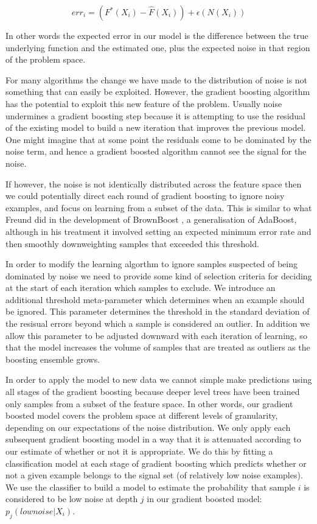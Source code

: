 \documentclass[12pt,a4paper]{article}
\begin{document}
\begin{equation}
err_i = ( F^*(X_i) - \hat{F}(X_i) )  + \epsilon(N(X_i))
\label{eq:noisyerror}
\end{equation}

In other words the expected error in our model is the difference between the true underlying function and the estimated one,
plus the expected noise in that region of the problem space.

For many algorithms the change we have made to the distribution of noise is not something that can easily be exploited.
However, the gradient boosting algorithm has the potential to exploit this new feature of the problem. Usually noise undermines
a gradient boosting step because it is attempting to use the residual of the existing model to build a new iteration that
improves the previous model. One might imagine that at some point the residuals come to be dominated by the noise term, and hence a
gradient boosted algorithm cannot see the signal for the noise.

If however, the noise is not identically distributed across the feature space then we could potentially direct each round of
gradient boosting to ignore noisy examples, and focus on learning from a subset of the data. This is similar to what Freund
did in the development of BrownBoost \cite{Freund2001}, a generalisation of AdaBoost, although in his treatment it involved
setting an expected minimum error rate and then smoothly downweighting samples that exceeded this threshold.

In order to modify the learning algorthm to ignore samples suspected of being dominated by noise we need to provide some
kind of selection criteria for deciding at the start of each iteration which samples to exclude.
We introduce an additional threshold meta-parameter which determines when an example should be ignored. This parameter
determines the threshold in the standard deviation of the resisual errors beyond which a sample is considered an outlier.
In addition we allow this parameter to be adjusted downward with each iteration of learning, so that the model 
increases the volume of samples that are treated as outliers as the boosting ensemble grows.

In order to apply the model to new data we cannot simple make predictions using all stages of the gradient boosting because
deeper level trees have been trained only samples from a subset of the feature space. In other words, our gradient boosted model
covers the problem space at different levels of granularity, depending on our expectations of the noise distribution.
We only apply each subsequent gradient boosting model in a way that it is attenuated according to our estimate of
whether or not it is appropriate. We do this by fitting a classification model at each stage of gradient boosting which predicts
whether or not a given example belongs to the signal set (of relatively low noise examples). We use the classifier to
build a model to estimate the probability that sample $i$ is considered to be low noise at depth $j$ in our gradient 
boosted model: $p_j(low noise | X_i )$.
\end{document}
